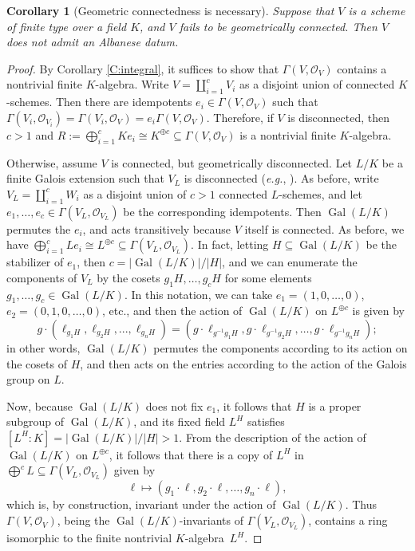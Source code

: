 \documentclass[11pt, reqno]{amsart}
\numberwithin{equation}{section}
\newtheorem{cor}[teo]{Corollary}
\theoremstyle{definition}
\theoremstyle{remark}
\def\calo{{\mathcal O}}
\def\iso{\cong}
\DeclareMathOperator{\gal}{Gal}
\newcommand{\abs}[1]{{\left|#1\right|}}
\begin{document}
\begin{cor}[Geometric connectedness is necessary]\label{C:GCX}
Suppose that $V$ is a scheme of finite type over a field $K$, and $V$ fails to be geometrically connected.  Then $V$ does not admit an Albanese datum.
\end{cor}
       
          

       


\begin{proof}
  By Corollary \ref{C:integral}, it suffices to show that $\Gamma(V,
  \calo_V)$ contains a nontrivial finite $K$-algebra.
Write $V = \coprod_{i=1}^c V_i$ as a disjoint union of  connected
$K$-schemes. Then there are idempotents $e_i \in \Gamma(V, \mathcal
O_V)$ such that $\Gamma(V_i, \mathcal O_{V_i}) = \Gamma(V_i, \mathcal
O_V) = e_i \Gamma(V, \mathcal O_V)$.  Therefore, if $V$ is
disconnected, then $c>1$ and
$R := \bigoplus_{i=1}^c K e_i  \iso K^{\oplus c}
\subseteq \Gamma(V, \calo_V)$ is a nontrivial finite $K$-algebra. 

Otherwise, assume $V$ is connected, but geometrically disconnected.  Let $L/K$ be a finite Galois
extension such that $V_L$ is
disconnected (\emph{e.g.}, \cite[Prop.~5.53]{GW20}).  As before, write $V_L =
\coprod_{i=1}^{c} W_i$ as a disjoint union of $c>1$ 
connected $L$-schemes, and let $e_1, \dots, e_c \in \Gamma(V_L, \mathcal O_{V_L})$
be the corresponding idempotents.  Then $\operatorname{Gal}(L/K)$ permutes the $e_i$, and
acts transitively because $V$ itself is connected.  
As before, we have $\bigoplus_{i=1}^cLe_i\cong L^{\oplus c}\subseteq \Gamma(V_L,\mathcal O_{V_L})$.  In fact, letting $H \subseteq \operatorname{Gal}(L/K)$ be the stabilizer of $e_1$, 
then  $c=|\operatorname{Gal}(L/K)|/|H|$, and we can enumerate the components of $V_L$ by the cosets  $g_1H,\dots, g_cH$ for some elements $g_1,\dots,g_c\in \operatorname{Gal}(L/K)$.  
In this notation, we can take 
$e_1 = (1,0,\dots,0)$, $e_2=(0,1,0,\dots,0)$, etc., and then the  action of $\gal(L/K)$ on $L^{\oplus c}$ is given by  $$g\cdot (\ell_{g_1H}, \ell_{g_2H},...,\ell_{g_nH}) = (g\cdot \ell_{g^{-1}g_1H}, g\cdot \ell_{g^{-1}g_2H},\dots,g\cdot \ell_{g^{-1}g_nH});$$
in other words, $\operatorname{Gal}(L/K)$ permutes the components according to  its action on the  cosets of $H$,  and then acts on the entries according to the action of the Galois group on $L$.
 
Now, because $\operatorname{Gal}(L/K)$
does not fix $e_1$, it follows that $H$ is a proper subgroup of $\operatorname{Gal}(L/K)$, and its fixed field $L^H$ 
satisfies $[L^H:K] = |\operatorname{Gal}(L/K)|/\abs H > 1$.  From the description of the action of $\operatorname{Gal}(L/K)$ on  $L^{\oplus c}$, it follows that there is a copy of $L^H$ in $\bigoplus ^cL\subseteq \Gamma(V_L,\mathcal O_{V_L})$ given by
$$
\ell\mapsto (g_1\cdot \ell, g_2\cdot \ell, \dots,g_n\cdot \ell),
$$
which is, by construction, invariant under the action of $\operatorname{Gal}(L/K)$.
           Thus $\Gamma(V, \mathcal O_V)$, being the $\operatorname{Gal}(L/K)$-invariants of $\Gamma(V_L,\mathcal O_{V_L})$,
contains a  ring isomorphic to the finite nontrivial $K$-algebra~$L^H$.   
\end{proof}
\end{document}
